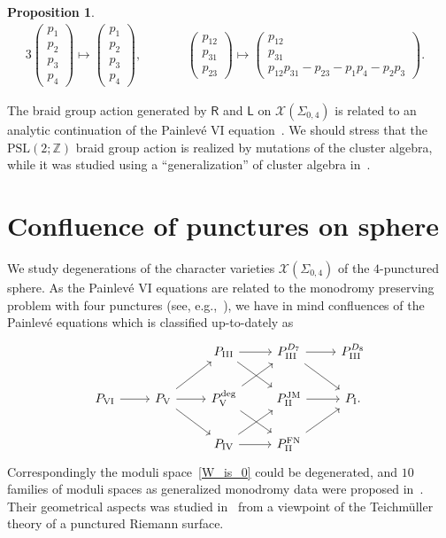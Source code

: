 \documentclass[10pt,a4paper]{amsart}
\numberwithin{equation}{section}
\newtheorem{Proposition}[Theorem]{Proposition}
 { \theoremstyle{definition}
\newtheorem{Definition}[Theorem]{Definition}
\newtheorem{Note}[Theorem]{Note}
\newtheorem{Example}[Theorem]{Example}
\newtheorem{Remark}[Theorem]{Remark} }
\begin{document}
\begin{Proposition}
\begin{alignat*}{3}
\begin{pmatrix}
 p_1 \\ p_2 \\ p_3 \\ p_4
 \end{pmatrix}
 \mapsto
 \begin{pmatrix}
 p_1 \\ p_2 \\ p_3 \\ p_4
 \end{pmatrix} ,
 \qquad &&
 \begin{pmatrix}
 p_{12} \\ p_{31} \\ p_{23}
 \end{pmatrix}
 \mapsto
 \begin{pmatrix}
 p_{12} \\ p_{31} \\
 p_{12} p_{31} - p_{23}
 - p_1 p_4 - p_2 p_3
 \end{pmatrix} .&
\end{alignat*}
\end{Proposition}

The braid group action generated by $\mathsf{R}$ and $\mathsf{L}$ on $\mathcal{X}(\Sigma_{0,4})$ is related to an analytic continuation of the Painlev{\'e} VI equation~\cite{Iwasaki02a, Iwasaki03a}. We should stress that the $\mathrm{PSL}(2;\mathbb{Z})$ braid group action is realized by mutations of the cluster algebra, while it was studied using a ``generalization'' of cluster algebra in~\cite{ChekhShapi14a}.

\section{Confluence of punctures on sphere}\label{sec:confluence}
 We study degenerations of the character varieties $\mathcal{X}(\Sigma_{0,4})$ of the $4$-punctured sphere. As the Painlev{\'e} VI equations are related to the monodromy preserving problem with four punctures (see, e.g.,~\cite{MJimb82a}), we have in mind confluences of the Painlev{\'e} equations which is classified up-to-dately as~\cite{OhyamOkumu06a}
\begin{equation} \label{Painleve_confluence}
 \begin{tikzcd}
 & &
 P_{\mathrm{III}} \arrow[r] \arrow[dr] &
 P_{\mathrm{III}}^{D_7} \arrow[r] \arrow[dr]&
 P_{\mathrm{III}}^{D_8}
 \\
 P_{\mathrm{VI}}
 \arrow[r] &
 P_{\mathrm{V}}
 \arrow[ur] \arrow[r] \arrow[dr] &
 P_{\mathrm{V}}^{\text{deg}} \arrow[ur] \arrow{rd}&
 P_{\mathrm{II}}^{\text{JM}} \arrow[r] &
 P_{\mathrm{I}}.
 \\
 & &
 P_{\mathrm{IV}} \arrow[ur] \arrow[r] &
 P_{\mathrm{II}}^{\text{FN}} \arrow[ur] &
 \end{tikzcd}
\end{equation}
Correspondingly the moduli space~\eqref{W_is_0} could be degenerated, and $10$ families of moduli spaces as generalized monodromy data were proposed in~\cite{vdPutSaito09a}. Their geometrical aspects was studied in~\cite{ChekMazzRubt15a} from a viewpoint of the Teichm{\"u}ller theory of a punctured Riemann surface.
\end{document}
